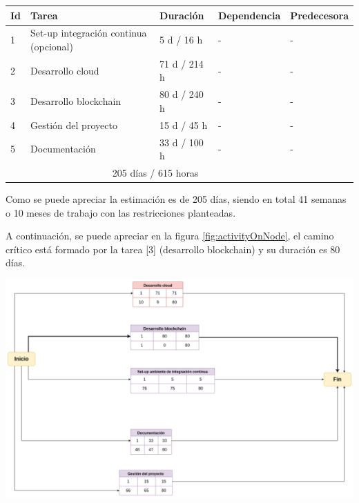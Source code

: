 \documentclass[
11pt, %
]{charter}
\begin{document}
\begin{table}[ht]
\begin{tabularx}{\linewidth}{@{}|l|X|l|l|l|@{}}
\hline
\rowcolor[HTML]{C0C0C0}
Id	& Tarea           						& Duración 	& Dependencia	& Predecesora 	\\ \hline
1	& Set-up integración continua (opcional)	& 5 d / 16 h 		& -        		&  -				\\ \hline
2	& Desarrollo cloud						& 71 d / 214 h		& -				&  -      		\\ \hline
3	& Desarrollo blockchain    				& 80 d / 240 h		& -			 	& -			\\ \hline
4	& Gestión del proyecto 					& 15 d / 45 h		& -				&  - 			\\ \hline
5	& Documentación    						& 33 d / 100 h		& -			 	& -				\\ \hline
\rowcolor[HTML]{C0C0C0}
\multicolumn{2}{|c|}{TOTAL} & \multicolumn{3}{c|}{ 205 días / 615 horas}  \\ \hline
\end{tabularx}
\end{table}

Como se puede apreciar la estimación es de 205 días, siendo en total 41 semanas o 10 meses de trabajo con las restricciones planteadas.

A continuación, se puede apreciar en la figura \ref{fig:activityOnNode}, el camino crítico está formado por la tarea [3] (desarrollo blockchain) y su duración es 80 días.

\begin{center}
 \includegraphics[scale=0.30]{./Figuras/activity-on-node}
 \label{fig:activityOnNode}
\end{center}
\end{document}
